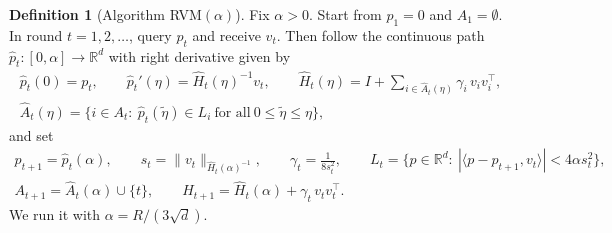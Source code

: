 \documentclass[11pt]{article}
\theoremstyle{plain}
\theoremstyle{definition}
\newtheorem{definition}[theorem]{Definition}
\theoremstyle{remark}
\newcommand{\R}{\mathbb{R}}
\newcommand{\ip}[2]{\langle #1, #2\rangle}
\begin{document}
\begin{definition}[Algorithm RVM$(\alpha)$]\label{def:alg}
Fix $\alpha>0$. Start from $p_1=0$ and $A_1=\emptyset$. In round $t=1,2,\dots$, query $p_t$ and receive $v_t$. Then
follow the continuous path $\hat p_t:[0,\alpha]\to\R^{d}$ with right derivative given by
\begin{equation}\label{eq:move}
\begin{gathered}
  \hat p_t(0)=p_t,\qquad \hat p_t'(\eta)=\hat H_t(\eta)^{-1}v_t,\qquad
  \hat H_t(\eta)=I+\sum_{i\in\hat A_t(\eta)}\gamma_i\,v_iv_i^{\top},\\
  \hat A_t(\eta)=\bigl\{i\in A_t:\ \hat p_t(\tilde\eta)\in L_i\
    \text{for all}\ 0\le\tilde\eta\le\eta\bigr\},
\end{gathered}
\end{equation}
and set
\begin{equation}\label{eq:stretch}
\begin{gathered}
  p_{t+1}=\hat p_t(\alpha),\qquad s_t=\|v_t\|_{\hat H_t(\alpha)^{-1}},\qquad
  \gamma_t=\frac{1}{8s_t^{2}},\qquad
  L_t=\bigl\{p\in\R^{d}:\ |\ip{p-p_{t+1}}{v_t}|<4\alpha s_t^{2}\bigr\},\\
  A_{t+1}=\hat A_t(\alpha)\cup\{t\},\qquad H_{t+1}=\hat H_t(\alpha)+\gamma_t\,v_tv_t^{\top} .
\end{gathered}
\end{equation}
We run it with $\alpha=R/(3\sqrt d)$.
\end{definition}
\end{document}
